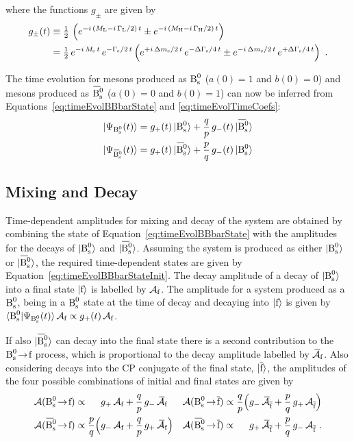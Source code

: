 where the functions $g_\pm$ are given by
\begin{align}
  \label{eq:timeEvolQp}
  g_\pm(t) &\equiv \tfrac{1}{2}\, \left( e^{-i\,(M_\text{L}-i\,\Gamma_\text{L}/2)\,t} \pm e^{-i\,(M_\text{H}-i\,\Gamma_\text{H}/2)\,t} \right) \\
           &= \tfrac{1}{2}\, e^{-i\,M_\text{s}\,t}\, e^{-\Gamma_\text{s}/2\,t}
                \left( e^{+i\,\Delta m_\text{s}/2\,t}\, e^{-\Delta\Gamma_\text{s}/4\,t} \pm e^{-i\,\Delta m_\text{s}/2\,t}\, e^{+\Delta\Gamma_\text{s}/4\,t} \right) \nonumber
           \ .
\end{align}

The time evolution for mesons produced as $\text{B}_\text{s}^0$ ($a(0)=1$ and $b(0)=0$) and mesons produced as $\Bsbar$ ($a(0)=0$ and $b(0)=1$) can now be
inferred from Equations~\ref{eq:timeEvolBBbarState} and \ref{eq:timeEvolTimeCoefs}:
\begin{subequations}
  \label{eq:timeEvolBBbarStateInit}
  \begin{align}
    |\Psi_{\Bs}(t)\rangle    = g_+(t)\,\Bsst    + \qp\,g_-(t)\,\Bsbarst \\
    |\Psi_{\Bsbar}(t)\rangle = g_+(t)\,\Bsbarst + \pq\,g_-(t)\,\Bsst
  \end{align}
\end{subequations}

\subsection{Mixing and Decay}

Time-dependent amplitudes for mixing and decay of the \BsBsbar{} system are obtained by combining the state of
Equation~\ref{eq:timeEvolBBbarState} with the amplitudes for the decays of $|\text{B}_\text{s}^0\rangle$ and $\Bsbarst$. Assuming the system is produced as
either $|\text{B}_\text{s}^0\rangle$ or $\Bsbarst$, the required time-dependent states are given by Equation~\ref{eq:timeEvolBBbarStateInit}. The decay amplitude
of a decay of $|\text{B}_\text{s}^0\rangle$ into a final state $|\text{f}\rangle$ is labelled by $\mathcal{A}_{\text{f}}$. The amplitude for a system produced as a $\text{B}_\text{s}^0$, being in a $\text{B}_\text{s}^0$
state at the time of decay and decaying into $|\text{f}\rangle$ is given by $\langle\text{B}_\text{s}^0|\Psi_{\text{B}_\text{s}^0}(t)\rangle\,\mathcal{A}_{\text{f}} \propto g_+(t)\,\mathcal{A}_{\text{f}}$.

If also $\Bsbarst$ can decay into the final state there is a second contribution to the $\text{B}_\text{s}^0\!\to\!{\text{f}}$ process, which is proportional to the
decay amplitude labelled by $\kern 0.23em \overline{\kern -0.23em \mathcal{A}}_{\text{f}}$. Also considering decays into the CP conjugate of the final state, $|\overline{\text{f}}\rangle$, the amplitudes of the
four possible combinations of initial and final states are given by
\begin{equation}
  \label{eq:mixDecayAmps}
  \begin{alignedat}{4}
    \mathcal{A}(\Bstof) &\propto& & g_+\, \Af + \qp\, g_-\, \Abarf &
    \quad
    \mathcal{A}(\Bstofbar) &\propto& \;\qp \Big( & g_-\, \Abarfbar + \pq\, g_+\, \Afbar \Big)
    \\
    \mathcal{A}(\Bsbartof) &\propto& \;\pq \Big( & g_-\, \Af + \qp\, g_+\, \Abarf \Big) &
    \mathcal{A}(\Bsbartofbar) &\propto& & g_+\, \Abarfbar + \pq\, g_-\, \Afbar
    \ .
  \end{alignedat}
\end{equation}

